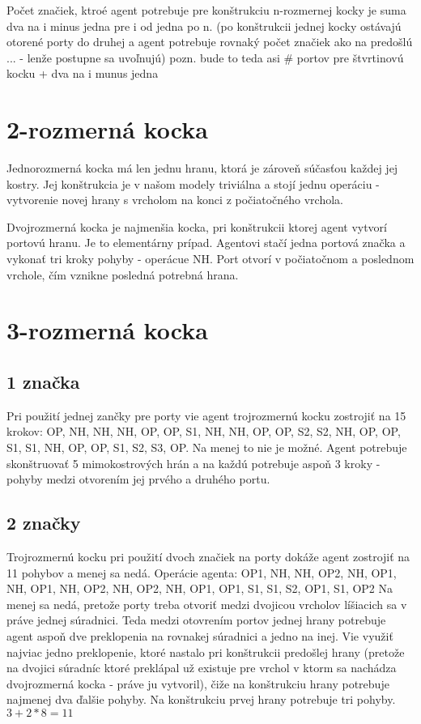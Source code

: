 Počet značiek, ktroé agent potrebuje pre konštrukciu n-rozmernej kocky je
suma dva na i minus jedna pre i od jedna po n. (po konštrukcii jednej kocky
ostávajú otorené porty do druhej a agent potrebuje rovnaký počet značiek ako
na predošlú ... - lenže postupne sa uvoľnujú) pozn. bude to teda asi \#
portov pre štvrtinovú kocku + dva na i munus jedna
\fi 

\section{2-rozmerná kocka}
Jednorozmerná kocka má len jednu hranu, ktorá je zároveň súčasťou každej jej
kostry. Jej konštrukcia je v našom modely triviálna a stojí jednu operáciu -
vytvorenie novej hrany s vrcholom na konci z počiatočného vrchola.

Dvojrozmerná kocka je najmenšia kocka, pri konštrukcii ktorej agent vytvorí
portovú hranu. Je to elementárny prípad. Agentovi stačí jedna portová značka 
a vykonať tri kroky pohyby - operácue NH. Port otvorí v počiatočnom a
poslednom vrchole, čím vznikne posledná potrebná hrana.
\section{3-rozmerná kocka}
\subsection{1 značka}
Pri použití jednej zančky pre porty vie agent trojrozmernú kocku zostrojiť 
na 15 krokov:
OP, NH, NH, NH, OP, OP, S1, NH, NH, OP, OP, S2, S2, NH, OP, OP, S1, S1, NH, OP, OP, S1, S2, S3, OP. Na
menej to nie je možné. Agent potrebuje skonštruovať 5 mimokostrových hrán a na
každú potrebuje aspoň 3 kroky - pohyby medzi otvorením jej prvého a druhého portu.

\subsection{2 značky}
Trojrozmernú kocku pri použití dvoch značiek na porty dokáže agent zostrojiť
na 11 pohybov a menej sa nedá. Operácie agenta:
OP1, NH, NH, OP2, NH, OP1, NH, OP1, NH, OP2, NH, OP2, NH, OP1, OP1, S1, S1, S2, OP1, S1, OP2
Na menej sa nedá, pretože porty treba otvoriť medzi dvojicou vrcholov
líšiacich sa v práve jednej súradnici. Teda medzi otovrením portov jednej
hrany potrebuje agent aspoň dve preklopenia na rovnakej súradnici a jedno na
inej. Vie využiť najviac jedno preklopenie, ktoré nastalo pri konštrukcii
predošlej hrany (pretože na dvojici súradníc ktoré preklápal už existuje pre
vrchol v ktorm sa nachádza dvojrozmerná kocka - práve ju vytvoril), 
čiže na konštrukciu hrany potrebuje najmenej dva ďalšie
pohyby. Na konštrukciu prvej hrany potrebuje tri pohyby. $3 + 2 * 8 = 11$

